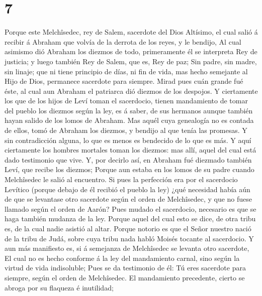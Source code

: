\hypertarget{section-6}{%
\section{7}\label{section-6}}

 Porque este Melchîsedec, rey de Salem, sacerdote del Dios
Altísimo, el cual salió á recibir á Abraham que volvía de la derrota de
los reyes, y le bendijo,  Al cual asimismo dió Abraham los
diezmos de todo, primeramente él se interpreta Rey de justicia; y luego
también Rey de Salem, que es, Rey de paz;  Sin padre, sin
madre, sin linaje; que ni tiene principio de días, ni fin de vida, mas
hecho semejante al Hijo de Dios, permanece sacerdote para siempre.
 Mirad pues cuán grande fué éste, al cual aun Abraham el
patriarca dió diezmos de los despojos.  Y ciertamente los
que de los hijos de Leví toman el sacerdocio, tienen mandamiento de
tomar del pueblo los diezmos según la ley, es á saber, de sus hermanos
aunque también hayan salido de los lomos de Abraham.  Mas
aquél cuya genealogía no es contada de ellos, tomó de Abraham los
diezmos, y bendijo al que tenía las promesas.  Y sin
contradicción alguna, lo que es menos es bendecido de lo que es más.
 Y aquí ciertamente los hombres mortales toman los diezmos:
mas allí, aquel del cual está dado testimonio que vive.  Y,
por decirlo así, en Abraham fué diezmado también Leví, que recibe los
diezmos;  Porque aun estaba en los lomos de su padre cuando
Melchîsedec le salió al encuentro.  Si pues la perfección
era por el sacerdocio Levítico (porque debajo de él recibió el pueblo la
ley) ¿qué necesidad había aún de que se levantase otro sacerdote según
el orden de Melchîsedec, y que no fuese llamado según el orden de Aarón?
 Pues mudado el sacerdocio, necesario es que se haga
también mudanza de la ley.  Porque aquel del cual esto se
dice, de otra tribu es, de la cual nadie asistió al altar. 
Porque notorio es que el Señor nuestro nació de la tribu de Judá, sobre
cuya tribu nada habló Moisés tocante al sacerdocio.  Y aun
más manifiesto es, si á semejanza de Melchîsedec se levanta otro
sacerdote,  El cual no es hecho conforme á la ley del
mandamiento carnal, sino según la virtud de vida indisoluble;
 Pues se da testimonio de él: Tú eres sacerdote para
siempre, según el orden de Melchîsedec.  El mandamiento
precedente, cierto se abroga por su flaqueza é inutilidad; 
